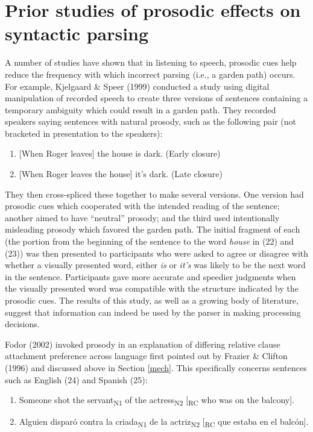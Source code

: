 \documentclass[11pt,oneside]{book}
\providecommand{\tightlist}{%
  \setlength{\itemsep}{0pt}\setlength{\parskip}{0pt}}
\begin{document}
\hypertarget{prosyn}{%
\section{Prior studies of prosodic effects on syntactic parsing}\label{prosyn}}

A number of studies have shown that in listening to speech, prosodic cues help reduce the frequency with which incorrect parsing (i.e., a garden path) occurs. For example, Kjelgaard \& Speer (1999) conducted a study using digital manipulation of recorded speech to create three versions of sentences containing a temporary ambiguity which could result in a garden path. They recorded speakers saying sentences with natural prosody, such as the following pair (not bracketed in presentation to the speakers):

\begin{enumerate}
\def\labelenumi{(\arabic{enumi})}
\setcounter{enumi}{21}
\tightlist
\item
  {[}When Roger leaves{]} the house is dark. (Early closure)
\item
  {[}When Roger leaves the house{]} it's dark. (Late closure)
\end{enumerate}

They then cross-spliced these together to make several versions. One version had prosodic cues which cooperated with the intended reading of the sentence; another aimed to have ``neutral'' prosody; and the third used intentionally misleading prosody which favored the garden path. The initial fragment of each (the portion from the beginning of the sentence to the word \emph{house} in (22) and (23)) was then presented to participants who were asked to agree or disagree with whether a visually presented word, either \emph{is} or \emph{it's} was likely to be the next word in the sentence. Participants gave more accurate and speedier judgments when the visually presented word was compatible with the structure indicated by the prosodic cues. The results of this study, as well as a growing body of literature, suggest that information can indeed be used by the parser in making processing decisions.

Fodor (2002) invoked prosody in an explanation of differing relative clause attachment preference across language first pointed out by Frazier \& Clifton (1996) and discussed above in Section \ref{mech}. This specifically concerns sentences such as English (24) and Spanish (25):

\begin{enumerate}
\def\labelenumi{(\arabic{enumi})}
\setcounter{enumi}{23}
\tightlist
\item
  Someone shot the servant\textsubscript{N1} of the actress\textsubscript{N2} {[}\textsubscript{RC} who was on the balcony{]}.
\item
  Alguien disparó contra la criada\textsubscript{N1} de la actriz\textsubscript{N2} {[}\textsubscript{RC} que estaba en el balcón{]}.
\end{enumerate}
\end{document}
